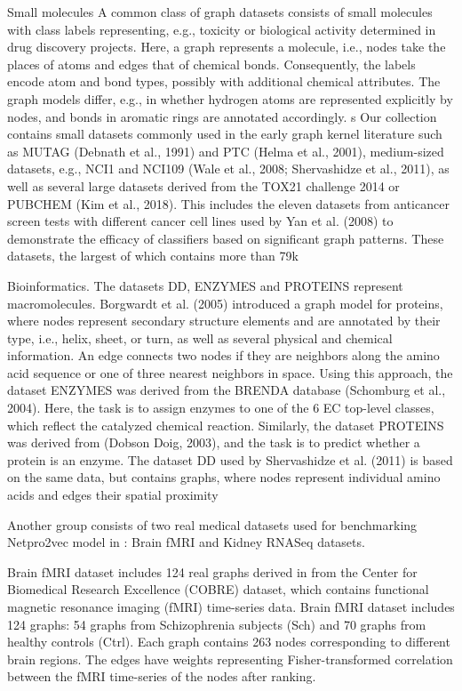 Small molecules
A common class of graph datasets consists
of small molecules with class labels representing, e.g., toxicity
or biological activity determined in drug discovery projects.
Here, a graph represents a molecule, i.e., nodes take the places
of atoms and edges that of chemical bonds. Consequently, the
labels encode atom and bond types, possibly with additional
chemical attributes. The graph models differ, e.g., in whether
hydrogen atoms are represented explicitly by nodes, and bonds
in aromatic rings are annotated accordingly.
s
Our collection contains small datasets commonly used in the
early graph kernel literature such as MUTAG (Debnath et al.,
1991) and PTC (Helma et al., 2001), medium-sized datasets,
e.g., NCI1 and NCI109 (Wale et al., 2008; Shervashidze et al.,
2011), as well as several large datasets derived from the TOX21
challenge 2014 or PUBCHEM (Kim et al., 2018). This includes
the eleven datasets from anticancer screen tests with different
cancer cell lines used by Yan et al. (2008) to demonstrate
the efficacy of classifiers based on significant graph patterns.
These datasets, the largest of which contains more than 79k


Bioinformatics. The datasets DD, ENZYMES and PROTEINS
represent macromolecules. Borgwardt et al. (2005) introduced
a graph model for proteins, where nodes represent secondary
structure elements and are annotated by their type, i.e., helix,
sheet, or turn, as well as several physical and chemical information. An edge connects two nodes if they are neighbors along
the amino acid sequence or one of three nearest neighbors in
space. Using this approach, the dataset ENZYMES was derived
from the BRENDA database (Schomburg et al., 2004). Here, the
task is to assign enzymes to one of the 6 EC top-level classes,
which reflect the catalyzed chemical reaction. Similarly, the
dataset PROTEINS was derived from (Dobson  Doig, 2003),
and the task is to predict whether a protein is an enzyme. The
dataset DD used by Shervashidze et al. (2011) is based on
the same data, but contains graphs, where nodes represent
individual amino acids and edges their spatial proximity


Another group consists of two real medical datasets used for benchmarking Netpro2vec model in \cite{Netpro2vec}: Brain fMRI and
Kidney RNASeq datasets.

Brain fMRI dataset includes 124 real graphs derived in \cite{BrainFmri} from the Center for Biomedical Research Excellence (COBRE) dataset, which contains
functional magnetic resonance imaging (fMRI) time-series data. Brain fMRI dataset includes 124 graphs: 54 graphs from Schizophrenia subjects (Sch) and 70 graphs from
healthy controls (Ctrl). Each graph contains 263 nodes corresponding to different brain regions. The edges have weights representing Fisher-transformed correlation between
the fMRI time-series of the nodes after ranking.

